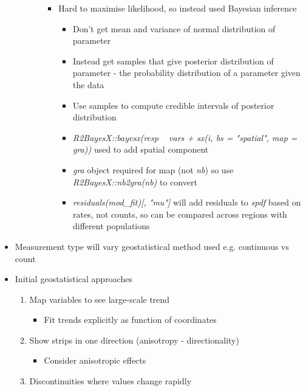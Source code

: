 \documentclass{article}
\begin{document}
\begin{itemize}
\begin{itemize}
\begin{enumerate}
\begin{itemize}
\begin{itemize}
                \end{itemize}
                \item Hard to maximise likelihood, so instead used Bayesian inference
                \begin{itemize}
                    \item Don't get mean and variance of normal distribution of parameter
                    \item Instead get samples that give posterior distribution of parameter - the probability distribution of a parameter given the data
                    \item Use samples to compute credible intervals of posterior distribution
                    \item \textit{R2BayesX::bayesx(resp ~ vars + sx(i, bs = "spatial", map = gra))} used to add spatial component
                    \item \textit{gra} object required for map (not \textit{nb}) so use \textit{R2BayesX::nb2gra(nb)} to convert
                    \item \textit{residuals(mod\_fit)[, "mu"]} will add residuals to \textit{spdf} based on rates, not counts, so can be compared across regions with different populations
                \end{itemize}
            \end{itemize}
        \end{enumerate}
    \end{itemize}
    \item Measurement type will vary geostatistical method used e.g. continuous vs count
    \item Initial geostatistical approaches
    \begin{enumerate}
        \item Map variables to see large-scale trend
        \begin{itemize}
            \item Fit trends explicitly as function of coordinates
        \end{itemize}
        \item Show strips in one direction (anisotropy - directionality)
        \begin{itemize}
            \item Consider anisotropic effects
        \end{itemize}
        \item Discontinuities where values change rapidly
        \begin{itemize}

\end{itemize}
\end{enumerate}
\end{itemize}
\end{document}
